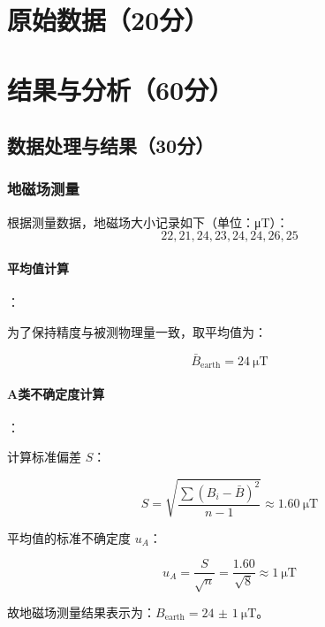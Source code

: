 \documentclass{../../templates/Report}%
\begin{document}
\begin{fullreportonly}
    \section{原始数据（20分）}
    \section{结果与分析（60分）}
    \subsection{数据处理与结果（30分）}

    \subsubsection{地磁场测量}
    根据测量数据，地磁场大小记录如下（单位：\unit{\micro\tesla}）：
    \begin{equation*}
        22, 21, 24, 23, 24, 24, 26, 25
    \end{equation*}

    \paragraph{平均值计算}：

    为了保持精度与被测物理量一致，取平均值为：

    \begin{equation*}
        \bar{B}_{\text{earth}} = \SI{24}{\micro\tesla}
    \end{equation*}

    \paragraph{A类不确定度计算}：

    计算标准偏差 $S$：

    \begin{equation*}
        S = \sqrt{\frac{\sum(B_i - \bar{B})^2}{n-1}} \approx \SI{1.60}{\micro\tesla}
    \end{equation*}

    平均值的标准不确定度 $u_A$：

    \begin{equation*}
        u_A = \frac{S}{\sqrt{n}} = \frac{1.60}{\sqrt{8}} \approx \SI{1}{\micro\tesla}
    \end{equation*}

    故地磁场测量结果表示为：$B_{\text{earth}} = \SI{24(1)}{\micro\tesla}$。


\end{fullreportonly}
\end{document}
